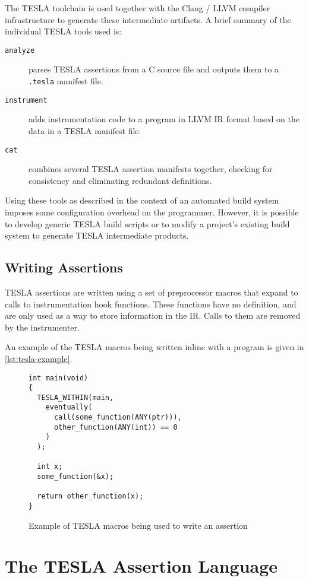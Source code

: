The TESLA toolchain is used together with the Clang / LLVM compiler
infrastructure to generate these intermediate artifacts. A brief summary of the
individual TESLA tools used is:

\begin{description}
  \item[\texttt{analyze}] parses TESLA assertions from a C source file and
    outputs them to a \texttt{.tesla} manifest file.
  \item[\texttt{instrument}] adds instrumentation code to a program in LLVM IR
    format based on the data in a TESLA manifest file.
  \item[\texttt{cat}] combines several TESLA assertion manifests together,
    checking for consistency and eliminating redundant definitions.
\end{description}

Using these tools as described in the context of an automated build system
imposes some configuration overhead on the programmer. However, it is
possible to develop generic TESLA build scripts or to modify a project's
existing build system to generate TESLA intermediate products.

\subsection{Writing Assertions}

TESLA assertions are written using a set of preprocessor macros that expand to
calls to instrumentation hook functions. These functions have no definition, and
are only used as a way to store information in the IR. Calls to them are removed
by the instrumenter.

An example of the TESLA macros being written inline with a program is
given in \autoref{lst:tesla-example}.

\begin{figure}
  \begin{verbatim}
int main(void)
{
  TESLA_WITHIN(main,
    eventually(
      call(some_function(ANY(ptr))),
      other_function(ANY(int)) == 0
    )
  );

  int x;
  some_function(&x);

  return other_function(x);
}
  \end{verbatim}
  \caption{Example of TESLA macros being used to write an assertion}
  \label{lst:tesla-example}
\end{figure}

\section{The TESLA Assertion Language} \label{sec:assertions}

